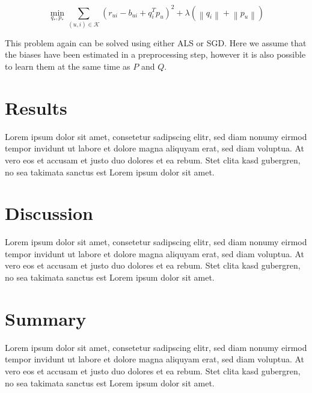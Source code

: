 \documentclass[10pt,conference,compsocconf]{IEEEtran}
\newcommand{\norm}[1]{\left\lVert#1\right\rVert}
\begin{document}
\begin{equation}
  \min_{q_*,p_*} \sum_{(u,i) \in \mathcal K} {(r_{ui} - b_{ui} + q_i^T p_u)}^2 +
  \lambda (\norm{q_i} + \norm{p_u})
\end{equation}

This problem again can be solved using either ALS or SGD\@. Here we assume that
the biases have been estimated in a preprocessing step, however it is also
possible to learn them at the same time as $P$ and $Q$.

\section{Results}
\label{sec:results}



Lorem ipsum dolor sit amet, consetetur sadipscing elitr, sed diam nonumy eirmod
tempor invidunt ut labore et dolore magna aliquyam erat, sed diam voluptua. At
vero eos et accusam et justo duo dolores et ea rebum. Stet clita kasd gubergren,
no sea takimata sanctus est Lorem ipsum dolor sit amet.


\section{Discussion}
\label{sec:discussion}

Lorem ipsum dolor sit amet, consetetur sadipscing elitr, sed diam nonumy eirmod
tempor invidunt ut labore et dolore magna aliquyam erat, sed diam voluptua. At
vero eos et accusam et justo duo dolores et ea rebum. Stet clita kasd gubergren,
no sea takimata sanctus est Lorem ipsum dolor sit amet.


\section{Summary}
\label{sec:summary}

Lorem ipsum dolor sit amet, consetetur sadipscing elitr, sed diam nonumy eirmod
tempor invidunt ut labore et dolore magna aliquyam erat, sed diam voluptua. At
vero eos et accusam et justo duo dolores et ea rebum. Stet clita kasd gubergren,
no sea takimata sanctus est Lorem ipsum dolor sit amet.

\renewcommand*{\UrlFont}{\rmfamily}
\printbibliography%
\end{document}
